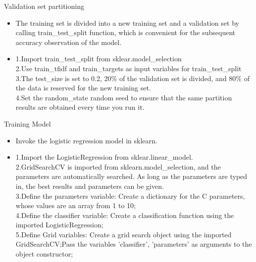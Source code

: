 \documentclass[
 size=14pt,
 paper=smartboard,  %
 mode=present, 		%
 display=slides, 	%
 style=tuliplab,  	%
 pauseslide,
 fleqn,leqno]{powerdot}
\begin{document}
\begin{slide}{Validation set partitioning}
  \begin{center}
  
    {
      \begin{itemize}
      \item 
       The training set is divided into a new training set and a validation set by calling train_test_split function, which is convenient for the subsequent accuracy observation of the model.
       \item
        1.Import train_test_split from sklear.model_selection\\
        2.Use train_tfidf and train_targets as input variables for train_test_split\\
        3.The test_size is set to 0.2, 20$\%$ of the validation set is divided, and 80$\%$ of the data is reserved for the new training set.\\
        4.Set the random_state random seed to ensure that the same partition results are obtained every time you run it.\\
     
      
      \end{itemize}
      }
  
  \end{center}
  \bigskip
  
\end{slide}
\begin{slide}{Training Model}
  \begin{center}
  
    {
      \begin{itemize}
      \item 
       Invoke the logistic regression model in sklearn.
      
      \item 
        1.Import the LogisticRegression from sklear.linear_model.\\
        2.GridSearchCV is imported from sklearn.model_selection, and the parameters are automatically searched. As long as the parameters are typed in, the best results and parameters can be given.\\
        3.Define the parameters variable: Create a dictionary for the C parameters, whose values are an array from 1 to 10;\\
        4.Define the classifier variable: Create a classification function using the imported LogisticRegression;\\
        5.Define Grid variables: Create a grid search object using the imported GridSearchCV;Pass the variables 'classifier', 'parameters' as arguments to the object constructor;\\
       
      \end{itemize}
      }
  
  \end{center}
  \bigskip
\end{slide}
\end{document}
